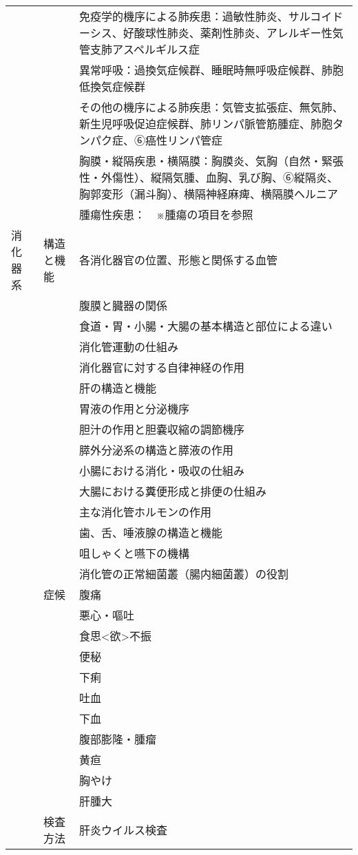 \begin{xltabular}{\linewidth}{XXX}
 &  & 免疫学的機序による肺疾患：過敏性肺炎、サルコイドーシス、好酸球性肺炎、薬剤性肺炎、アレルギー性気管支肺アスペルギルス症 \\
 &  & 異常呼吸：過換気症候群、睡眠時無呼吸症候群、肺胞低換気症候群 \\
 &  & その他の機序による肺疾患：気管支拡張症、無気肺、新生児呼吸促迫症候群、肺リンパ脈管筋腫症、肺胞タンパク症、➅癌性リンパ管症 \\
 &  & 胸膜・縦隔疾患・横隔膜：胸膜炎、気胸（自然・緊張性・外傷性）、縦隔気腫、血胸、乳び胸、➅縦隔炎、胸郭変形（漏斗胸）、横隔神経麻痺、横隔膜ヘルニア \\
 &  & 腫瘍性疾患：　※腫瘍の項目を参照 \\
消化器系 & 構造と機能 & 各消化器官の位置、形態と関係する血管 \\
 &  & 腹膜と臓器の関係 \\
 &  & 食道・胃・小腸・大腸の基本構造と部位による違い \\
 &  & 消化管運動の仕組み \\
 &  & 消化器官に対する自律神経の作用 \\
 &  & 肝の構造と機能 \\
 &  & 胃液の作用と分泌機序 \\
 &  & 胆汁の作用と胆嚢収縮の調節機序 \\
 &  & 膵外分泌系の構造と膵液の作用 \\
 &  & 小腸における消化・吸収の仕組み \\
 &  & 大腸における糞便形成と排便の仕組み \\
 &  & 主な消化管ホルモンの作用 \\
 &  & 歯、舌、唾液腺の構造と機能 \\
 &  & 咀しゃくと嚥下の機構 \\
 &  & 消化管の正常細菌叢（腸内細菌叢）の役割 \\
 & 症候 & 腹痛 \\
 &  & 悪心・嘔吐 \\
 &  & 食思<欲>不振 \\
 &  & 便秘 \\
 &  & 下痢 \\
 &  & 吐血 \\
 &  & 下血 \\
 &  & 腹部膨隆・腫瘤 \\
 &  & 黄疸 \\
 &  & 胸やけ \\
 &  & 肝腫大 \\
 & 検査方法 & 肝炎ウイルス検査 \\

\end{xltabular}
